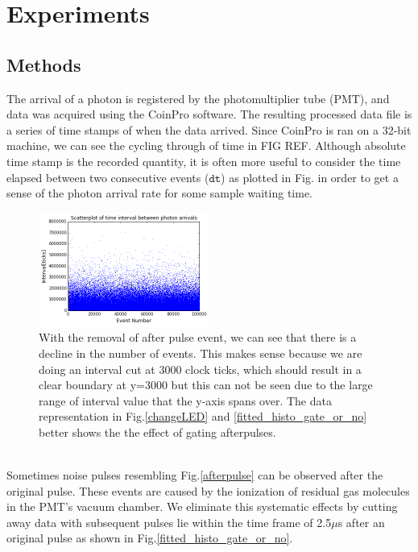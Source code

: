\documentclass[authoryear, 12pt,5p, times]{elsarticle}
\begin{document}
\section{Experiments\label{experiment}}
	\subsection{Methods}
\indent The arrival of a photon is registered by the photomultiplier tube (PMT), and data was acquired using the CoinPro software. The resulting processed data file is a series of time stamps of when the data arrived. Since CoinPro is ran on a 32-bit machine, we can see the cycling through of time in FIG REF. Although absolute time stamp is the recorded quantity, it is often more useful to consider the time elapsed between two consecutive events ($\texttt{dt}$) as plotted in Fig. in order to get a sense of  the photon arrival rate for some sample waiting time.
\begin{figure}[h]
\centering
\includegraphics[width=0.5\textwidth]{figures/interval_scatterplot}
\caption{With the removal of after pulse event, we can see that there is a decline in the number of events. This makes sense because we are doing an interval cut at 3000 clock ticks, which should result in a clear boundary at y=3000 but this can not be seen due to the large range of interval value that the y-axis spans over. The data representation in Fig.\ref{changeLED} and \ref{fitted_histo_gate_or_no} better shows the the effect of gating afterpulses. }
\label{scatterplot}
\end{figure}
\\
\indent Sometimes noise pulses resembling Fig.\ref{afterpulse} can be observed after the original pulse. These events are caused by  the ionization of residual gas molecules in the PMT's vacuum chamber.  We eliminate this systematic effects by cutting away data with subsequent pulses lie within the time frame of 2.5$\mu$s  after an original pulse as shown in Fig.\ref{fitted_histo_gate_or_no}.
\end{document}
